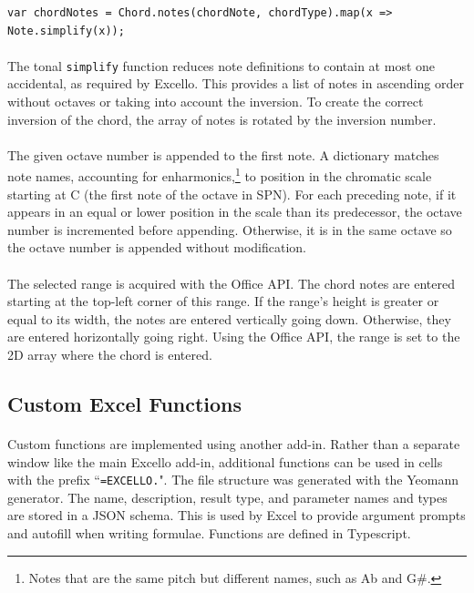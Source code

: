 \begin{verbatim}
var chordNotes = Chord.notes(chordNote, chordType).map(x => Note.simplify(x));
\end{verbatim}

\paragraph{} The tonal \texttt{simplify} function reduces note definitions to contain at most one accidental, as required by Excello. This provides a list of notes in ascending order without octaves or taking into account the inversion. To create the correct inversion of the chord, the array of notes is rotated by the inversion number.

\paragraph{} The given octave number is appended to the first note. A dictionary matches note names, accounting for enharmonics,\footnote{Notes that are the same pitch but different names, such as Ab and G\#.} to position in the chromatic scale starting at C (the first note of the octave in SPN). For each preceding note, if it appears in an equal or lower position in the scale than its predecessor, the octave number is incremented before appending. Otherwise, it is in the same octave so the octave number is appended without modification.

\paragraph{} The selected range is acquired with the Office API. The chord notes are entered starting at the top-left corner of this range. If the range's height is greater or equal to its width, the notes are entered vertically going down. Otherwise, they are entered horizontally going right. Using the Office API, the range is set to the 2D array where the chord is entered.

\subsection{Custom Excel Functions}

\paragraph{} Custom functions are implemented using another add-in. Rather than a separate window like the main Excello add-in, additional functions can be used in cells with the prefix ``\texttt{=EXCELLO.}". The file structure was generated with the Yeomann generator. The name, description, result type, and parameter names and types are stored in a JSON schema. This is used by Excel to provide argument prompts and autofill when writing formulae. Functions are defined in Typescript.

